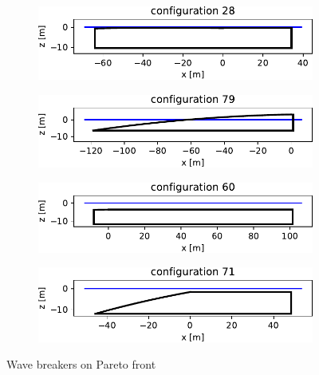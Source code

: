 \begin{figure}[h]
    \centering
    \begin{subfigure}[b]{0.49\textwidth}
        \centering
        \includegraphics[width=\linewidth]{figures/ComFLOW/Breakwater Geometries/Design Iteration 1 captive WC2/breakwater_geometry28.pdf}
        \caption[]%
        {{\small }}    
        \label{}
    \end{subfigure}
    \hfill
    \begin{subfigure}[b]{0.49\textwidth}  
        \centering 
        \includegraphics[width=\linewidth]{figures/ComFLOW/Breakwater Geometries/Design Iteration 1 captive WC2/breakwater_geometry79.pdf}    
        {{\small }}    
        \label{}
    \end{subfigure}
    
    \centering
    \begin{subfigure}[b]{0.49\textwidth}  
        \centering 
        \includegraphics[width=\linewidth]{figures/ComFLOW/Breakwater Geometries/Design Iteration 1 captive WC2/breakwater_geometry60.pdf}    
        \caption[]%
        {{\small }}    
        \label{}
    \end{subfigure}
    \hfill
    \begin{subfigure}[b]{0.49\textwidth}
        \centering
        \includegraphics[width=\linewidth]{figures/ComFLOW/Breakwater Geometries/Design Iteration 1 captive WC2/breakwater_geometry71.pdf}    
        \caption[]%
        {{\small }}    
        \label{}
    \end{subfigure}
    
    \caption{Wave breakers on Pareto front}
    \label{}
\end{figure}




